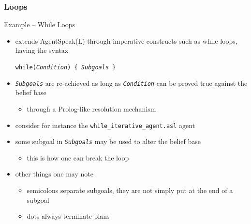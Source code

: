 \documentclass[presentation]{beamer}\mode<presentation>{\usetheme{AMSBolognaFC}}
\begin{document}
\subsubsection{Loops}

\begin{frame}[c, allowframebreaks]{Example \theJasonExample{} -- While Loops}
    \begin{itemize}
        \item \jason{} extends AgentSpeak(L) through imperative constructs such as \alert{while} loops, having the syntax
        \begin{center}
            \texttt{while(\textit{Condition}) \{ \textit{Subgoals} \} }
        \end{center}
        
        \vspace{.3cm}
        
        \item \texttt{\textit{Subgoals}} are re-achieved as long as \texttt{\textit{Condition}} can be proved true against the belief base
        \begin{itemize}
            \item through a Prolog-like resolution mechanism
        \end{itemize}
        
        \framebreak
        
        \item consider for instance the \texttt{while\_iterative\_agent.asl} agent
        
        
        \vspace{.3cm}
        
        \item some subgoal in \texttt{\textit{Subgoals}} may be used to alter the belief base
        \begin{itemize}
            \item this is how one can break the loop
        \end{itemize}
        
        \framebreak
        
        \item other things one may note
        \begin{itemize}
            \item semicolons separate subgoals, they are not simply put at the end of a subgoal
            \item dots always terminate plans
        \end{itemize}
        

\end{itemize}
\end{frame}
\end{document}
